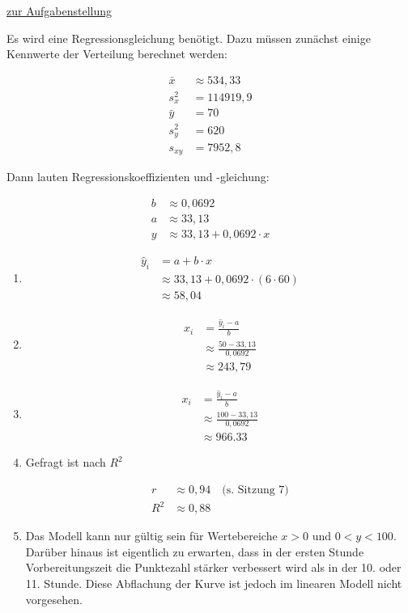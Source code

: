 \documentclass[
  11pt,
  ngerman,
  a4paper,
]{report}
\begin{document}
\protect\hyperlink{aufgabe-8-5}{zur Aufgabenstellung}

Es wird eine Regressionsgleichung benötigt. Dazu müssen zunächst einige Kennwerte der Verteilung berechnet werden:

\[
\begin{aligned}
\bar{x}&\approx534{,}33\\
s^2_x&=114919{,}9\\
\bar{y} &= 70\\
s^2_y &=620\\
s_{xy}&= 7952{,}8
\end{aligned}
\]

Dann lauten Regressionskoeffizienten und -gleichung:

\[
\begin{aligned}
b &\approx 0{,}0692\\
a &\approx 33{,}13\\
y &\approx 33{,}13 + 0{,}0692 \cdot x
\end{aligned}
\]

\begin{enumerate}
\def\labelenumi{\alph{enumi})}
\item
  \[\begin{aligned}
    \hat{y}_i &=a+b\cdot x\\
    &\approx 33{,}13 + 0{,}0692 \cdot (6\cdot 60)\\
    &\approx 58{,}04
    \end{aligned}\]
\item
  \[\begin{aligned}
    x_i&=\frac{\hat{y}_i-a}{b}\\[6pt]
       &\approx\frac{50-33{,}13}{0{,}0692}\\[4pt]
       &\approx 243{,}79
    \end{aligned}\]
\item
  \[\begin{aligned}
    x_i&=\frac{\hat{y}_i-a}{b}\\[6pt]
       &\approx\frac{100-33{,}13}{0{,}0692}\\[4pt]
       &\approx 966.33
    \end{aligned}\]
\item
  Gefragt ist nach \(R^2\)

  \[\begin{aligned}
   r &\approx 0{,}94 \quad \textrm{(s. Sitzung 7)}\\
   R^2 &\approx 0{,}88
   \end{aligned}\]
\item
  Das Modell kann nur gültig sein für Wertebereiche \(x > 0\) und \(0 < y < 100\). Darüber hinaus ist eigentlich zu erwarten, dass in der ersten Stunde Vorbereitungszeit die Punktezahl stärker verbessert wird als in der 10. oder 11. Stunde. Diese Abflachung der Kurve ist jedoch im linearen Modell nicht vorgesehen.
\end{enumerate}
\end{document}
